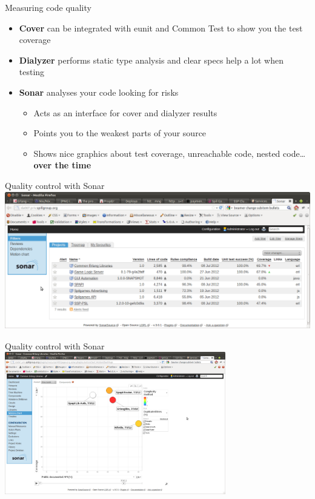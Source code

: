\documentclass[aspectratio=169]{beamer}
\begin{document}
\begin{frame}{Measuring code quality}
    \begin{itemize}
    \pause
    \item \textbf{Cover} can be integrated with eunit and Common Test to show you the test coverage
    \pause
    \item \textbf{Dialyzer} performs static type analysis and clear specs help a lot when testing
    \pause
    \item \textbf{Sonar} analyses your code looking for risks
        \begin{itemize}
        \pause
        \item Acts as an interface for cover and dialyzer results
        \pause
        \item Points you to the weakest parts of your source
        \pause
        \item Shows nice graphics about test coverage, unreachable code, nested code\dots \textbf{over the time}
        \end{itemize}
    \end{itemize}
\end{frame}

\begin{frame}{Quality control with Sonar}
    \includegraphics[height=6.0cm]{images/sonarMain.png}
\end{frame}

\begin{frame}{Quality control with Sonar}
    \includegraphics[height=6.2cm]{images/sonarGraphics.png}
\end{frame}
\end{document}
